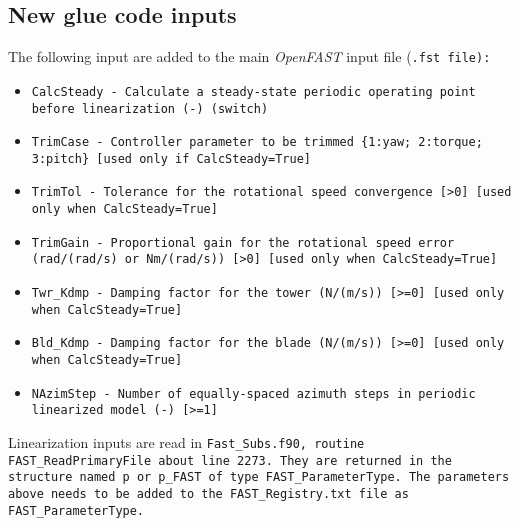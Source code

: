 \documentclass[11pt]{article}
\newcommand{\question}[1]{{\color{red}{#1}}}
\providecommand{\DIFaddbegin}{} %
\providecommand{\DIFaddend}{} %
\providecommand{\DIFdelbegin}{} %
\providecommand{\DIFdelend}{} %
\begin{document}
\subsection{New glue code inputs}
\label{sec:newinputs}
The following input are added to the main \textit{OpenFAST} input file (\tt{.fst} file):
\begin{itemize}\tightlist
    \item \DIFdelbegin %
\DIFdelend \DIFaddbegin \tt{CalcSteady - Calculate a steady-state periodic operating point before linearization (-) (switch)}
    \DIFaddend \item \tt{TrimCase   - Controller parameter to be trimmed \{1:yaw; 2:torque; 3:pitch\} [used only if CalcSteady=True]}
    \item \tt{TrimTol    - Tolerance for the rotational speed convergence [>0] [used only when CalcSteady=True] }
    \item \DIFdelbegin %
\DIFdelend \DIFaddbegin \tt{TrimGain    - Proportional gain for the rotational speed error (rad/(rad/s) or Nm/(rad/s)) [>0] [used only when CalcSteady=True] }
    \DIFaddend \item \tt{Twr\_Kdmp   - Damping factor for the tower (N/(m/s)) [>=0] [used only when CalcSteady=True] }
    \item \tt{Bld\_Kdmp  - Damping factor for the blade (N/(m/s)) [>=0] [used only when CalcSteady=True] }
    \item \tt{NAzimStep  - Number of equally-spaced azimuth steps in periodic linearized model (-) [>=1] }
\end{itemize}
\question{Do we want to adjust more damping values?}
Linearization inputs are read in \tt{Fast\_Subs.f90}, routine \tt{FAST\_ReadPrimaryFile} about line 2273. They are returned in the structure named \tt{p} or \tt{p\_FAST} of type \tt{FAST\_ParameterType}. The parameters above needs to be added to the \tt{FAST\_Registry.txt} file as \tt{FAST\_ParameterType}.
\end{document}
